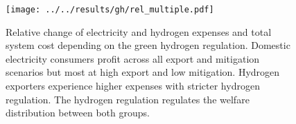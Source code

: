 \begin{figure}[h!]
    \centering
    \texttt{[image: ../../results/gh/rel\_multiple.pdf]}
    \caption{Relative change of electricity and hydrogen expenses and total system cost depending on the green hydrogen regulation. Domestic electricity consumers profit across all export and mitigation scenarios but most at high export and low mitigation. Hydrogen exporters experience higher expenses with stricter hydrogen regulation. The hydrogen regulation regulates the welfare distribution between both groups.}
    \label{fig:expenses_all}
\end{figure}







